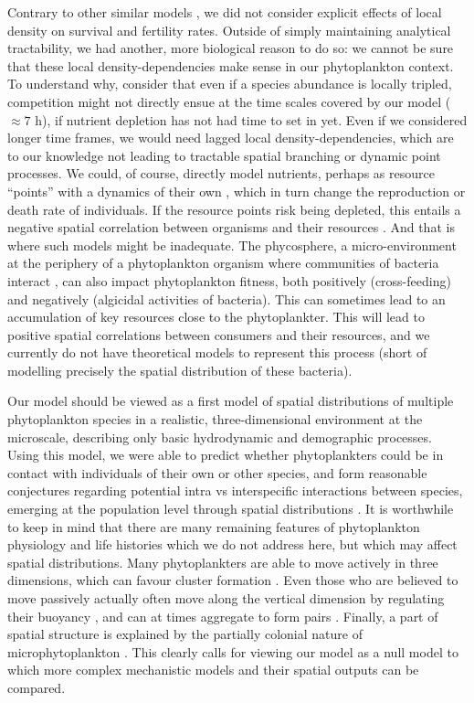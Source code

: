\documentclass[12pt,english]{article}
\begin{document}
Contrary to other similar models \citep[e.g.,][]{birch_master_2006,bouderbala_3d_2018},
we did not consider explicit effects of local density on survival
and fertility rates. Outside of simply maintaining analytical tractability,
we had another, more biological reason to do so: we cannot be sure
that these local density-dependencies make sense in our phytoplankton
context. To understand why, consider that even if a species abundance
is locally tripled, competition might not directly ensue at the time
scales covered by our model ($\approx7$ h), if nutrient depletion
has not had time to set in yet. Even if we considered longer time
frames, we would need lagged local density-dependencies, which are
to our knowledge not leading to tractable spatial branching or dynamic
point processes. We could, of course, directly model nutrients, perhaps
as resource ``points'' with a dynamics of their own \citep{murrell_local_2005,north_interactions_2007},
which in turn change the reproduction or death rate of individuals.
If the resource points risk being depleted, this entails a negative
spatial correlation between organisms and their resources \citep{murrell_local_2005,barraquand2012evolutionarily}.
And that is where such models might be inadequate. The phycosphere,
a micro-environment at the periphery of a phytoplankton organism where
communities of bacteria interact \citep{seymour_zooming_2017}, can
also impact phytoplankton fitness, both positively (cross-feeding)
and negatively (algicidal activities of bacteria). This can sometimes
lead to an accumulation of key resources close to the phytoplankter.
This will lead to positive spatial correlations between consumers
and their resources, and we currently do not have theoretical models
to represent this process (short of modelling precisely the spatial
distribution of these bacteria).

Our model should be viewed as a first model of spatial distributions
of multiple phytoplankton species in a realistic, three-dimensional
environment at the microscale, describing only basic hydrodynamic
and demographic processes. Using this model, we were able to predict
whether phytoplankters could be in contact with individuals of their
own or other species, and form reasonable conjectures regarding potential intra vs interspecific interactions between species, emerging at the population level through spatial distributions \citep{detto_stabilization_2016}.
It is worthwhile to keep in mind that there are many remaining features
of phytoplankton physiology and life histories which we do not address
here, but which may affect spatial distributions. Many phytoplankters
are able to move actively in three dimensions, which can favour cluster
formation \citep{breier_emergence_2018}. Even those who are believed
to move passively actually often move along the vertical dimension
by regulating their buoyancy \citep{reynolds2006ecology}, and can
at times aggregate to form pairs \citep{font-munoz_collective_2019}.
Finally, a part of spatial structure is explained by the partially
colonial nature of microphytoplankton \citep{kiorboe_coagulation_1990}.
This clearly calls for viewing our model as a null model to which
more complex mechanistic models and their spatial outputs can be compared.
\end{document}
